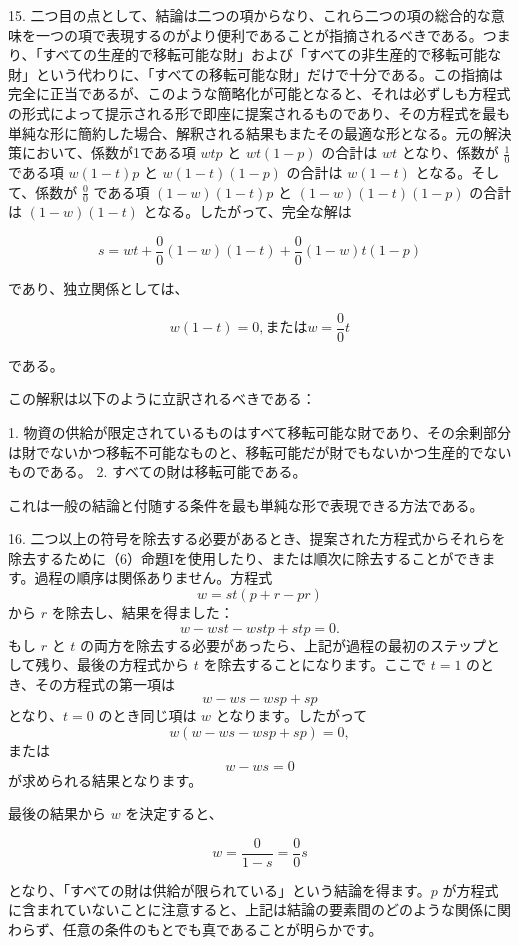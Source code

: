 \documentclass[a4paper,11pt,openany]{ltjsbook}
\begin{document}
15. 二つ目の点として、結論は二つの項からなり、これら二つの項の総合的な意味を一つの項で表現するのがより便利であることが指摘されるべきである。つまり、「すべての生産的で移転可能な財」および「すべての非生産的で移転可能な財」という代わりに、「すべての移転可能な財」だけで十分である。この指摘は完全に正当であるが、このような簡略化が可能となると、それは必ずしも方程式の形式によって提示される形で即座に提案されるものであり、その方程式を最も単純な形に簡約した場合、解釈される結果もまたその最適な形となる。元の解決策において、係数が1である項 $wtp$ と $wt(1 - p)$ の合計は $wt$ となり、係数が $\frac{1}{0}$ である項 $w(1 - t)p$ と $w(1 - t)(1 - p)$ の合計は $w(1 - t)$ となる。そして、係数が $\frac{0}{0}$ である項 $(1 - w)(1 - t)p$ と $(1 - w)(1 - t)(1 - p)$ の合計は $(1 - w)(1 - t)$ となる。したがって、完全な解は

\[
s = wt + \frac{0}{0}(1-w)(1-t) + \frac{0}{0}(1-w)t(1-p)
\]

であり、独立関係としては、

\[
w(1-t) = 0, \text{または} w = \frac{0}{0}t
\]

である。

この解釈は以下のように立訳されるべきである：

1. 物資の供給が限定されているものはすべて移転可能な財であり、その余剰部分は財でないかつ移転不可能なものと、移転可能だが財でもないかつ生産的でないものである。
2. すべての財は移転可能である。

これは一般の結論と付随する条件を最も単純な形で表現できる方法である。

16. 二つ以上の符号を除去する必要があるとき、提案された方程式からそれらを除去するために（6）命題Iを使用したり、または順次に除去することができます。過程の順序は関係ありません。方程式
\[
w = st \left(p + r - pr\right)
\]
から $r$ を除去し、結果を得ました：
\[
w - wst - wstp + stp = 0.
\]
もし $r$ と $t$ の両方を除去する必要があったら、上記が過程の最初のステップとして残り、最後の方程式から $t$ を除去することになります。ここで $t = 1$ のとき、その方程式の第一項は
\[
w - ws - wsp + sp
\]
となり、$t = 0$ のとき同じ項は $w$ となります。したがって
\[
w \left(w - ws - wsp + sp\right) = 0,
\]
または
\[
w - ws = 0
\]
が求められる結果となります。

最後の結果から $w$ を決定すると、

\[
w=\frac{0}{1-s}=\frac{0}{0}s
\]

となり、「すべての財は供給が限られている」という結論を得ます。$p$ が方程式に含まれていないことに注意すると、上記は結論の要素間のどのような関係に関わらず、任意の条件のもとでも真であることが明らかです。
\end{document}
